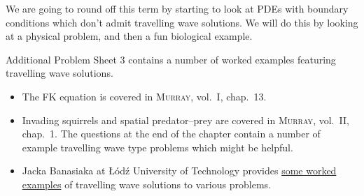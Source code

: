 \documentclass[main.tex]{subfiles}
\begin{document}
We are going to round off this term by starting to look at PDEs with boundary conditions which don't admit travelling wave solutions. We will do this by looking at a physical problem, and then a fun biological example.

\vspace{0.5cm}
\begin{do-it-yourself}
Additional Problem Sheet 3 contains a number of worked examples featuring travelling wave solutions.
\end{do-it-yourself}

\begin{extra-reading}
\begin{itemize}
	\item The FK equation is covered in \textsc{Murray}, vol.~I, chap.~13. 
	\item Invading squirrels and spatial predator--prey are covered in \textsc{Murray}, vol.~II, chap.~1. The questions at the end of the chapter contain a number of example travelling wave type problems which might be helpful.
	\item Jacka Banasiaka at Łódź University of Technology provides \href{http://im0.p.lodz.pl/~jbanasiak/FB/falebiegnace.pdf}{some worked examples} of travelling wave solutions to various problems. 
\end{itemize}
\end{extra-reading}
\end{document}
